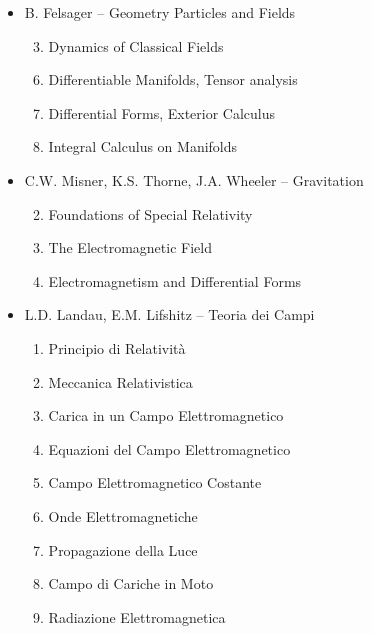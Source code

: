 \begin{itemize}
\item B. Felsager -- Geometry Particles and Fields
\begin{enumerate}
\setcounter{enumi}{2}
\item Dynamics of Classical Fields
\end{enumerate}

\begin{enumerate}
\setcounter{enumi}{5}
\item Differentiable Manifolds, Tensor analysis
\item Differential Forms, Exterior Calculus
\item Integral Calculus on Manifolds
\end{enumerate}

\item C.W. Misner, K.S. Thorne, J.A. Wheeler -- Gravitation
\begin{enumerate}
\setcounter{enumi}{1}
\item Foundations of Special Relativity
\item The Electromagnetic Field
\item Electromagnetism and Differential Forms
\end{enumerate}

\item L.D. Landau, E.M. Lifshitz -- Teoria dei Campi
\begin{enumerate}
\setcounter{enumi}{0}
\item Principio di Relatività
\item Meccanica Relativistica
\item Carica in un Campo Elettromagnetico
\item Equazioni del Campo Elettromagnetico
\item Campo Elettromagnetico Costante
\item Onde Elettromagnetiche
\item Propagazione della Luce
\item Campo di Cariche in Moto
\item Radiazione Elettromagnetica
\end{enumerate}


\end{itemize}

